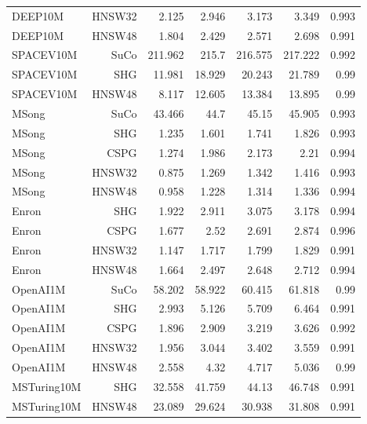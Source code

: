 \begin{table}[t]
\begin{tabular}{lrrrrrr}
DEEP10M & HNSW32 & 2.125 & 2.946 & 3.173 & 3.349 & 0.993 \\
DEEP10M & HNSW48 & 1.804 & 2.429 & 2.571 & 2.698 & 0.991 \\
SPACEV10M & SuCo & 211.962 & 215.7 & 216.575 & 217.222 & 0.992 \\
SPACEV10M & SHG & 11.981 & 18.929 & 20.243 & 21.789 & 0.99 \\
SPACEV10M & HNSW48 & 8.117 & 12.605 & 13.384 & 13.895 & 0.99 \\
MSong & SuCo & 43.466 & 44.7 & 45.15 & 45.905 & 0.993 \\
MSong & SHG & 1.235 & 1.601 & 1.741 & 1.826 & 0.993 \\
MSong & CSPG & 1.274 & 1.986 & 2.173 & 2.21 & 0.994 \\
MSong & HNSW32 & 0.875 & 1.269 & 1.342 & 1.416 & 0.993 \\
MSong & HNSW48 & 0.958 & 1.228 & 1.314 & 1.336 & 0.994 \\
Enron & SHG & 1.922 & 2.911 & 3.075 & 3.178 & 0.994 \\
Enron & CSPG & 1.677 & 2.52 & 2.691 & 2.874 & 0.996 \\
Enron & HNSW32 & 1.147 & 1.717 & 1.799 & 1.829 & 0.991 \\
Enron & HNSW48 & 1.664 & 2.497 & 2.648 & 2.712 & 0.994 \\
OpenAI1M & SuCo & 58.202 & 58.922 & 60.415 & 61.818 & 0.99 \\
OpenAI1M & SHG & 2.993 & 5.126 & 5.709 & 6.464 & 0.991 \\
OpenAI1M & CSPG & 1.896 & 2.909 & 3.219 & 3.626 & 0.992 \\
OpenAI1M & HNSW32 & 1.956 & 3.044 & 3.402 & 3.559 & 0.991 \\
OpenAI1M & HNSW48 & 2.558 & 4.32 & 4.717 & 5.036 & 0.99 \\
MSTuring10M & SHG & 32.558 & 41.759 & 44.13 & 46.748 & 0.991 \\
MSTuring10M & HNSW48 & 23.089 & 29.624 & 30.938 & 31.808 & 0.991 \\
\bottomrule
\end{tabular}
\end{table}
